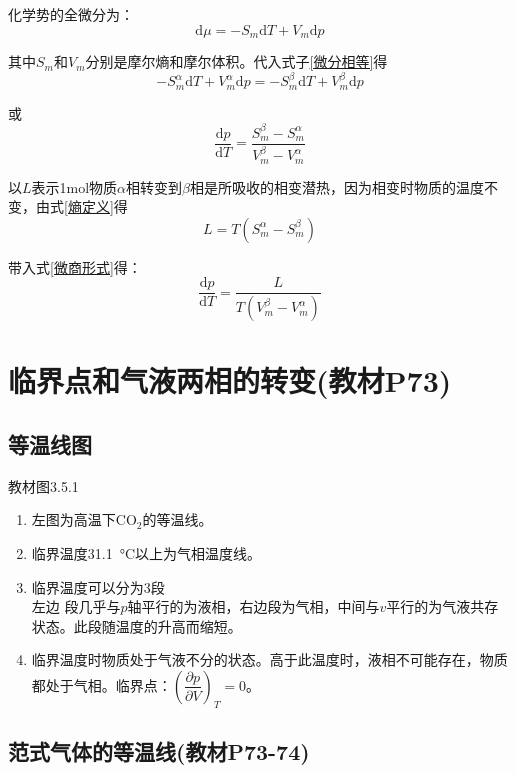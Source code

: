 \documentclass[oneside]{ctexbook}
\begin{document}
化学势的全微分为：
\begin{equation}
\mathrm{d}\mu=-S_m\mathrm{d}T+V_m\mathrm{d}p
\end{equation}

其中\(S_m\)和\(V_m\)分别是摩尔熵和摩尔体积。代入式子\ref{微分相等}得
\begin{equation}
-S_m^\alpha\mathrm{d}T+V_m^\alpha\mathrm{d}p=-S_m^\beta\mathrm{d}T+V_m^\beta\mathrm{d}p
\end{equation}

或
\begin{equation}
    \dfrac{\mathrm{d}p}{\mathrm{d}T}=\dfrac{S_m^\beta-S_m^\alpha}{V_m^\beta-V_m^\alpha}\label{微商形式}
\end{equation}

以\(L\)表示1mol物质\(\alpha\)相转变到\(\beta\)相是所吸收的相变潜热，因为相变时物质的温度不变，由式\ref{熵定义}得
\begin{equation}
L=T(S_m^\alpha-S_m^\beta)
\end{equation}

带入式\ref{微商形式}得：
\begin{equation}
\dfrac{\mathrm{d}p}{\mathrm{d}T}=\dfrac{L}{T(V_m^\beta-V_m^\alpha)}
\end{equation}

\section{临界点和气液两相的转变(教材P73)}

\subsection{等温线图}

教材图3.5.1%
\begin{enumerate}
    \item 左图为高温下\(\mathrm{CO_2}\)的等温线。
    \item 临界温度\qty{31.1}{\degreeCelsius}以上为气相温度线。
    \item 临界温度可以分为3段\\左边 段几乎与\(p\)轴平行的为液相，右边段为气相，中间与\(v\)平行的为气液共存状态。此段随温度的升高而缩短。
    \item 临界温度时物质处于气液不分的状态。高于此温度时，液相不可能存在，物质都处于气相。临界点：\(\left(\dfrac{\partial{}p}{\partial{}V}\right)_T=0\)。
\end{enumerate}

\subsection{范式气体的等温线(教材P73-74)}
\end{document}

